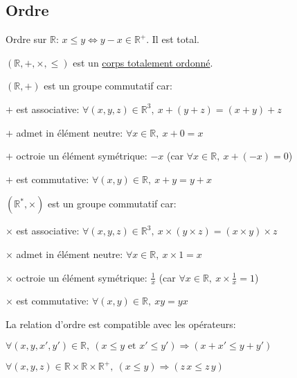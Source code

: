 \documentclass[12pt,twoside,a4paper]{article}
\begin{document}
		\subsection{Ordre}
			Ordre sur $\mathbb{R}$: $x\leqslant y\iff y-x\in\mathbb{R}^+$. Il est total.
			\begin{prop}
				$(\mathbb{R},+,\times,\leqslant)$ est un \underline{corps totalement ordonn\'e}.\\
				\begin{liste}
					\item $(\mathbb{R},+)$ est un groupe commutatif car:
						\begin{liste}
							\item[]$+$ est associative: $\forall(x,y,z)\in \mathbb{R}^3,\ x+(y+z)=(x+y)+z$
							\item[]$+$ admet in \'el\'ement neutre: $\forall x\in\mathbb{R},\ x+0=x$
							\item[]$+$ octroie un \'el\'ement sym\'etrique: $-x$ (car $\forall x\in\mathbb{R},\ x+(-x)=0$)
							\item[]$+$ est commutative: $\forall(x,y)\in\mathbb{R},\ x+y=y+x$
						\end{liste}
					\item $(\mathbb{R}^*,\times)$ est un groupe commutatif car:
						\begin{liste}
							\item[]$\times$ est associative: $\forall(x,y,z)\in \mathbb{R}^3,\ x\times(y\times z)=(x\times y)\times z$
							\item[]$\times$ admet in \'el\'ement neutre: $\forall x\in\mathbb{R},\ x\times1=x$
							\item[]$\times$ octroie un \'el\'ement sym\'etrique: $\frac{1}{x}$ (car $\forall x\in\mathbb{R},\ x\times\frac{1}{x}=1$)
							\item[]$\times$ est commutative: $\forall(x,y)\in\mathbb{R},\ xy=yx$
						\end{liste}
					\item La relation d'ordre est compatible avec les op\'erateurs:
						\begin{liste}
							\item[]$\forall(x,y,x',y')\in\mathbb{R},\ (x\leqslant y\text{ et }x'\leqslant y')\Rightarrow(x+x'\leqslant y+y')$
							\item[]$\forall(x,y,z)\in\mathbb{R}\times\mathbb{R}\times\mathbb{R}^+,\ (x\leqslant y)\Rightarrow (z\,x\leqslant z\,y)$
						\end{liste}
				\end{liste}
			\end{prop}
\end{document}
